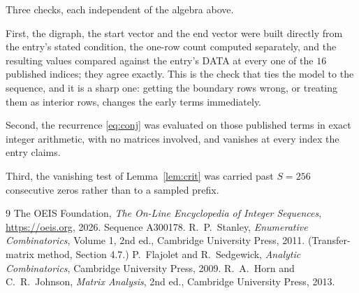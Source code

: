 \documentclass[11pt,a4paper]{article}
\theoremstyle{plain}
\theoremstyle{definition}
\begin{document}
Three checks, each independent of the algebra above.

First, the digraph, the start vector and the end vector were built directly from the
entry's stated condition, the one-row count computed separately, and the resulting values
compared against the entry's DATA at every one of the $16$ published indices; they
agree exactly. This is the check that ties the model to the sequence, and it is a sharp one:
getting the boundary rows wrong, or treating them as interior rows, changes the early terms
immediately.

Second, the recurrence \eqref{eq:conj} was evaluated on those published terms in exact
integer arithmetic, with no matrices involved, and vanishes at every index the entry claims.

Third, the vanishing test of Lemma~\ref{lem:crit} was carried past $S=256$ consecutive
zeros rather than to a sampled prefix.

\begin{thebibliography}{9}
 The OEIS Foundation, \emph{The On-Line Encyclopedia of Integer
Sequences}, \url{https://oeis.org}, 2026. Sequence A300178.
 R.~P.~Stanley, \emph{Enumerative Combinatorics}, Volume 1, 2nd ed.,
Cambridge University Press, 2011. (Transfer-matrix method, Section 4.7.)
 P.~Flajolet and R.~Sedgewick, \emph{Analytic Combinatorics}, Cambridge
University Press, 2009.
 R.~A.~Horn and C.~R.~Johnson, \emph{Matrix Analysis}, 2nd ed., Cambridge
University Press, 2013.
\end{thebibliography}
\end{document}
